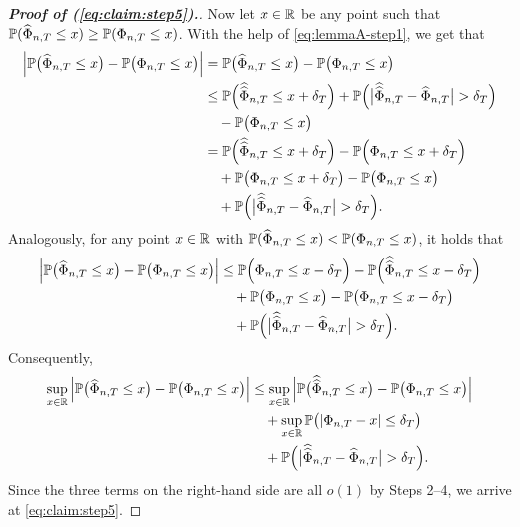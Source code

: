 \begin{proof}[\textnormal{\textbf{Proof of (\ref{eq:claim:step5}).}}]
Now let $x\in \mathbb{R}$ be any point such that $\mathbb{P}(\widehat{\Phi}_{n,T} \le x) \geq \mathbb{P}(\Phi_{n, T} \le x)$. With the help of \eqref{eq:lemmaA-step1}, we get that
\begin{align*}
\Big| \mathbb{P}\big(\widehat{\Phi}_{n, T} \le x\big) - \mathbb{P}\big(\Phi_{n,T} \le x\big) \Big| 
 & = \mathbb{P}\big(\widehat{\Phi}_{n, T} \le x\big) - \mathbb{P}\big(\Phi_{n,T} \le x\big) \\ 
 & \le \mathbb{P}\Big(\widehat{\widehat{\Phi}}_{n,T} \le x + \delta_{T}\Big) + \mathbb{P} \Big(\big|\widehat{\widehat{\Phi}}_{n,T} - \widehat{\Phi}_{n,T}\big| > \delta_{T} \Big) \\ 
 & \quad - \mathbb{P}\big(\Phi_{n,T} \le x\big)  \\
 & = \mathbb{P}\Big(\widehat{\widehat{\Phi}}_{n,T} \le x + \delta_{T}\Big) - \mathbb{P}\Big(\Phi_{n,T} \le x + \delta_{T}\Big)  \\
 & \quad +  \mathbb{P}\big(\Phi_{n,T} \le x + \delta_{T}\big)   - \mathbb{P}\big(\Phi_{n,T} \le x\big) \\ 
 & \quad + \mathbb{P} \Big(\big|\widehat{\widehat{\Phi}}_{n,T} - \widehat{\Phi}_{n,T}\big| > \delta_{T} \Big). 
\end{align*}
Analogously, for any point $x\in \mathbb{R}$ with $\mathbb{P}(\widehat{\Phi}_{n,T}\le x) < \mathbb{P}(\Phi_{n, T}\le x)$, it holds that 
\begin{align*}
\Big| \mathbb{P}\big(\widehat{\Phi}_{n, T} \le x\big) - \mathbb{P}\big(\Phi_{n,T} \le x\big) \Big| 
 & \le \mathbb{P}\Big( \Phi_{n,T} \le x - \delta_T \Big) - \mathbb{P}\Big(\widehat{\widehat{\Phi}}_{n,T} \le x - \delta_{T}\Big) \\
 & \quad + \mathbb{P}\big( \Phi_{n,T} \le x \big) - \mathbb{P}\big( \Phi_{n,T} \le x - \delta_T \big) \\
 & \quad + \mathbb{P} \Big(\big|\widehat{\widehat{\Phi}}_{n,T} - \widehat{\Phi}_{n,T}\big| > \delta_{T} \Big).  
\end{align*}
Consequently,  
\begin{align*}
\sup_{x \in \mathbb{R}} \Big| \mathbb{P}\big(\widehat{\Phi}_{n, T} \le x\big) - \mathbb{P}\big(\Phi_{n,T} \le x\big) \Big| 
 & \le \sup_{x \in \mathbb{R}} \Big| \mathbb{P}\big(\widehat{\widehat{\Phi}}_{n, T} \le x\big) - \mathbb{P}\big(\Phi_{n,T} \le x\big) \Big| \\
 & \quad + \sup_{x \in \mathbb{R}} \mathbb{P}\big( | \Phi_{n,T} - x | \le \delta_T \big) \\
 & \quad + \mathbb{P} \Big(\big|\widehat{\widehat{\Phi}}_{n,T} - \widehat{\Phi}_{n,T}\big| > \delta_{T} \Big). 
\end{align*}
Since the three terms on the right-hand side are all $o(1)$ by Steps 2--4, we arrive at \eqref{eq:claim:step5}. 
\end{proof}


